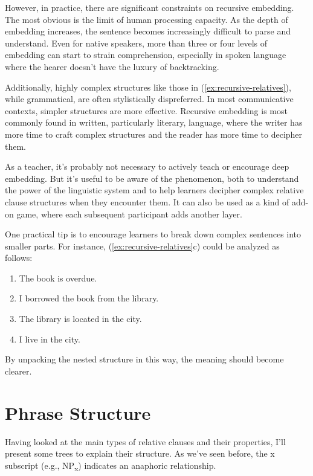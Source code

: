 However, in practice, there are significant constraints on recursive embedding. The most obvious is the limit of human processing capacity. As the depth of embedding increases, the sentence becomes increasingly difficult to parse and understand. Even for native speakers, more than three or four levels of embedding can start to strain comprehension, especially in spoken language where the hearer doesn't have the luxury of backtracking.

Additionally, highly complex structures like those in (\ref{ex:recursive-relatives}), while grammatical, are often stylistically dispreferred. In most communicative contexts, simpler structures are more effective. Recursive embedding is most commonly found in written, particularly literary, language, where the writer has more time to craft complex structures and the reader has more time to decipher them.

As a teacher, it's probably not necessary to actively teach or encourage deep embedding. But it's useful to be aware of the phenomenon, both to understand the power of the linguistic system and to help learners decipher complex relative clause structures when they encounter them. It can also be used as a kind of add-on game, where each subsequent participant adds another layer.

One practical tip is to encourage learners to break down complex sentences into smaller parts. For instance, (\ref{ex:recursive-relatives}c) could be analyzed as follows:

\begin{enumerate}[noitemsep]
    \item The book is overdue.
    \item I borrowed the book from the library.
    \item The library is located in the city.
    \item I live in the city.
\end{enumerate}

By unpacking the nested structure in this way, the meaning should become clearer.

\section{Phrase Structure}

Having looked at the main types of relative clauses and their properties, I'll present some trees to explain their structure. As we've seen before, the x subscript (e.g., NP\textsubscript{x}) indicates an anaphoric relationship.

